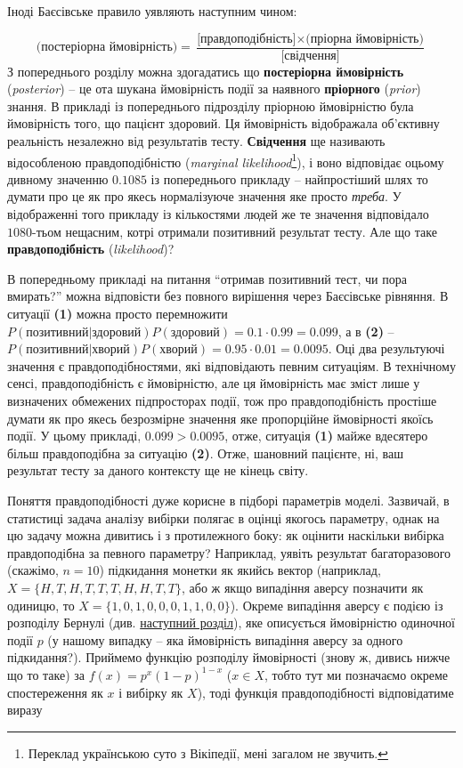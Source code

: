 \documentclass[
  11pt,
]{book}
\begin{document}
Іноді Баєсівське правило уявляють наступним чином:

\[\text{(постеріорна ймовірність)} = \frac{\text{[правдоподібність]} \times \text{(пріорна ймовірність)}}{\text{[свідчення]}}\]
З попереднього розділу можна здогадатись що \textbf{постеріорна ймовірність} (\emph{posterior}) -- це ота шукана ймовірність події за наявного \textbf{пріорного} (\emph{prior}) знання. В прикладі із попереднього підрозділу пріорною ймовірністю була ймовірність того, що пацієнт здоровий. Ця ймовірність відображала об'єктивну реальність незалежно від результатів тесту. \textbf{Свідчення} ще називають відособленою правдоподібністю (\emph{marginal likelihood}\footnote{Переклад українською суто з Вікіпедії, мені загалом не звучить.}), і воно відповідає оцьому дивному значенню \(0.1085\) із попереднього прикладу -- найпростіший шлях то думати про це як про якесь нормалізуюче значення яке просто \emph{треба}. У відображенні того прикладу із кількостями людей же те значення відповідало \(1080\)-тьом нещасним, котрі отримали позитивний результат тесту. Але що таке \textbf{правдоподібність} (\emph{likelihood})?

В попередньому прикладі на питання ``отримав позитивний тест, чи пора вмирать?'' можна відповісти без повного вирішення через Баєсівське рівняння. В ситуації \textbf{(1)} можна просто перемножити \(P(\text{позитивний|здоровий})P(\text{здоровий}) = 0.1 \cdot 0.99 = 0.099\), а в \textbf{(2)} -- \(P(\text{позитивний|хворий})P(\text{хворий}) = 0.95 \cdot 0.01 = 0.0095\). Оці два результуючі значення є правдоподібностями, які відповідають певним ситуаціям. В технічному сенсі, правдоподібність є ймовірністю, але ця ймовірність має зміст лише у визначених обмежених підпросторах події, тож про правдоподібність простіше думати як про якесь безрозмірне значення яке пропорційне ймовірності якоїсь події. У цьому прикладі, \(0.099 > 0.0095\), отже, ситуація \textbf{(1)} майже вдесятеро більш правдоподібна за ситуацію \textbf{(2)}. Отже, шановний пацієнте, ні, ваш результат тесту за даного контексту ще не кінець світу.

Поняття правдоподібності дуже корисне в підборі параметрів моделі. Зазвичай, в статистиці задача аналізу вибірки полягає в оцінці якогось параметру, однак на цю задачу можна дивитись і з протилежного боку: як оцінити наскільки вибірка правдоподібна за певного параметру? Наприклад, уявіть результат багаторазового (скажімо, \(n = 10\)) підкидання монетки як якийсь вектор (наприклад, \(X = \{H, T, H, T, T, T, H, H, T, T\}\), або ж якщо випадіння аверсу позначити як одиницю, то \(X = \{1, 0, 1, 0, 0, 0, 1, 1, 0, 0\}\)). Окреме випадіння аверсу є подією із розподілу Бернулі (див. \hyperref[pdfs]{наступний розділ}), яке описується ймовірністю одиночної події \(p\) (у нашому випадку -- яка ймовірність випадіння аверсу за одного підкидання?). Приймемо функцію розподілу ймовірності (знову ж, дивись нижче що то таке) за \(f(x) = p^x (1-p)^{1-x}\) (\(x \in X\), тобто тут ми позначаємо окреме спостереження як \(x\) і вибірку як \(X\)), тоді функція правдоподібності відповідатиме виразу
\end{document}

